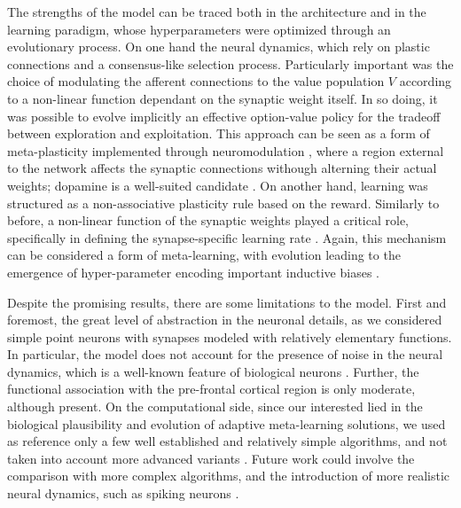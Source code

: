 The strengths of the model can be traced both in the architecture and in the learning paradigm, whose hyperparameters were optimized through an evolutionary process.
On one hand the neural dynamics, which rely on plastic connections and a consensus-like selection process.
Particularly important was the choice of modulating the afferent connections to the value population $V$ according to a non-linear function dependant on the synaptic weight itself. In so doing, it was possible to evolve implicitly an effective option-value policy for the tradeoff between exploration and exploitation.
This approach can be seen as a form of meta-plasticity implemented through neuromodulation \cite{wangMetalearningNaturalArtificial2021}, where a region external to the network affects the synaptic connections withough alterning their actual weights; dopamine is a well-suited candidate \cite{toblerAdaptiveCodingReward2005, roeschDopamineNeuronsEncode2007, coolsChemistryAdaptiveMind2019}.
On another hand, learning was structured as a non-associative plasticity rule based on the reward. Similarly to before, a non-linear function of the synaptic weights played a critical role, specifically in defining the synapse-specific learning rate \cite{larsenSynapsetypespecificPlasticityLocal2015}.
Again, this mechanism can be considered a form of meta-learning, with evolution leading to the emergence of hyper-parameter encoding important inductive biases \cite{inglisModulationDopamineAdaptive2021, iigayaAdaptiveLearningDecisionmaking2016}.

Despite the promising results, there are some limitations to the model. First and foremost, the great level of abstraction in the neuronal details, as we considered simple point neurons with synapses modeled with relatively elementary functions.
In particular, the model does not account for the presence of noise in the neural dynamics, which is a well-known feature of biological neurons \cite{faisalNoiseNeuronsOther2012}.
Further, the functional association with the pre-frontal cortical region is only moderate, although present.
On the computational side, since our interested lied in the biological plausibility and evolution of adaptive meta-learning solutions, we used as reference only a few well established and relatively simple algorithms, and not taken into account more advanced variants
\cite{tokicAdaptiveEGreedyExploration2010, tokicValueDifferenceBasedExploration2011, qiForcedExplorationBandit2023}.
Future work could involve the comparison with more complex algorithms, and the introduction of more realistic neural dynamics, such as spiking neurons \cite{nunesSpikingNeuralNetworks2022}.

